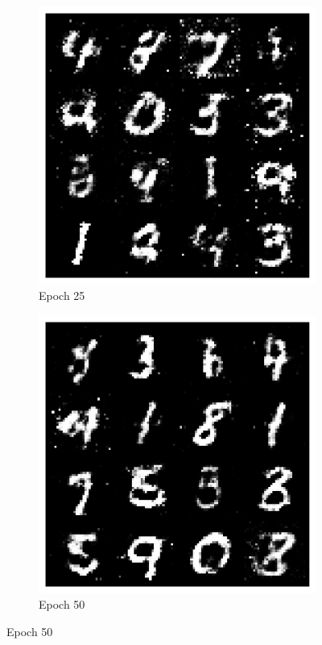 \documentclass[11pt,a4paper]{article}
\begin{document}
\begin{figure}[ht]
    \centering
    \begin{subfigure}[b]{0.48\textwidth}
        \includegraphics[width=\linewidth]{./images/epoch_25.png}
        \caption{Epoch 25}
        \label{fig:img1}
    \end{subfigure}
    \hfill
    \begin{subfigure}[b]{0.48\textwidth}
        \includegraphics[width=\linewidth]{./images/epoch_50.png}
        \caption{Epoch 50}
        \label{fig:img2}
    \end{subfigure}


\end{figure}
\end{document}
